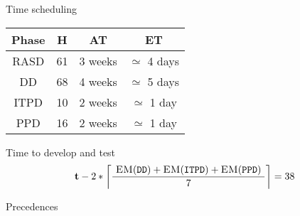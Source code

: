 \begin{frame}{Time scheduling}
	
\begingroup	

\footnotesize\centering\begin{tabular}{ >{\ttfamily}c c c c }

\toprule
\normalfont\textbf{Phase} & \normalfont\textbf{H} & \normalfont\textbf{AT} & \normalfont\textbf{ET} \\
\toprule

RASD & 		61 &	3 weeks & 	$\simeq$ 4 days \\\midrule
DD &		68 &	4 weeks & 	$\simeq$ 5 days \\\midrule
ITPD &		10 &	2 weeks &	$\simeq$ 1 day  \\\midrule
PPD &		16 &	2 weeks & 	$\simeq$ 1 day  \\

\bottomrule
	
\end{tabular}
	
	\endgroup
	
	\vspace{.2cm}

	\begin{block}{Time to develop and test}\begin{equation*}
%
\mathbf{t} - 2 * \left\lceil \frac{ \text{ \textsc{EM}(\texttt{DD})} + \text{\textsc{EM}(\texttt{ITPD})} + \text{\textsc{EM}(\texttt{PPD}) }}{7} \right\rceil = 38
%	
\end{equation*}\end{block}
	
	
	
	
\end{frame}





\begin{frame}{Precedences}%
\end{frame}
















